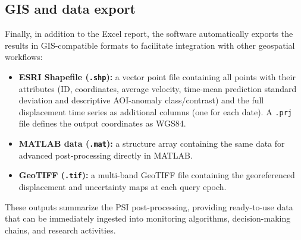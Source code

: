 \subsection{GIS and data export}
Finally, in addition to the Excel report, the software automatically exports the results in GIS-compatible formats to facilitate integration with other geospatial workflows:
\begin{itemize}
    \item \textbf{ESRI Shapefile (\texttt{.shp}):} a vector point file containing all points with their attributes (ID, coordinates, average velocity, time-mean prediction standard deviation and descriptive AOI-anomaly class/contrast) and the full displacement time series as additional columns (one for each date). A \texttt{.prj} file defines the output coordinates as WGS84.
    \item \textbf{MATLAB data (\texttt{.mat}):} a structure array containing the same data for advanced post-processing directly in MATLAB.
    \item \textbf{GeoTIFF (\texttt{.tif}):} a multi-band GeoTIFF file containing the georeferenced displacement and uncertainty maps at each query epoch.
\end{itemize}

These outputs summarize the PSI post-processing, providing ready-to-use data that can be immediately ingested into monitoring algorithms, decision-making chains, and research activities.
